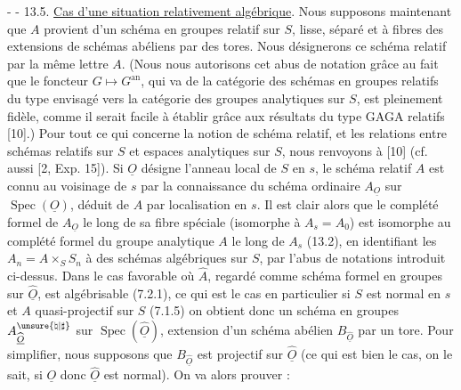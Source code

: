 -  - 
13.5. \uline{Cas d'une situation relativement algébrique}. Nous supposons maintenant que $A$ provient d'un schéma en groupes relatif sur $S$, lisse, séparé et à fibres des extensions de schémas abéliens par des tores. Nous désignerons ce schéma relatif par la même lettre $A$. (Nous nous autorisons cet abus de notation grâce au fait que le foncteur $G\longmapsto G^{\mathrm{an}}$, qui va de la catégorie des schémas en groupes relatifs du type envisagé vers la catégorie des groupes analytiques sur $S$, est pleinement fidèle, comme il serait facile à établir grâce aux résultats du type GAGA relatifs [10].) Pour tout ce qui concerne la notion de schéma relatif, et les relations entre schémas relatifs sur $S$ et espaces analytiques sur $S$, nous renvoyons à [10] (cf. aussi [2, Exp. 15]). Si $\underline O$ désigne l'anneau local de $S$ en $s$, le schéma relatif $A$ est connu au voisinage de $s$ par la connaissance du schéma ordinaire $A_{\underline O}$ sur $\operatorname{Spec}(\underline O)$, déduit de $A$ par localisation en $s$. Il est clair alors que le complété formel de $A_{\underline O}$ le long de sa fibre spéciale (isomorphe à $A_s=A_0$) est isomorphe au complété formel du groupe analytique $A$ le long de $A_s$ (13.2), en identifiant les $A_n=A\times_S S_n$ à des schémas algébriques sur $S$, par l'abus de notations introduit ci-dessus. Dans le cas favorable où $\widehat A$, regardé comme schéma formel en groupes sur $\widehat{\underline O}$, est algébrisable (7.2.1), ce qui est le cas en particulier si $S$ est normal en $s$ et $A$ quasi-projectif sur $S$ (7.1.5) on obtient donc un schéma en groupes $A_{\widehat{\underline O}}^{\unsure{\natural|\sharp}}$ sur $\operatorname{Spec}(\widehat{\underline O})$, extension d'un schéma abélien $B_{\widehat{\underline O}}$ par un tore. Pour simplifier, nous supposons que $B_{\widehat{\underline O}}$ est projectif sur $\widehat{\underline O}$ (ce qui est bien le cas, on le sait, si $\underline O$ donc $\widehat{\underline O}$ est normal). On va alors prouver :
